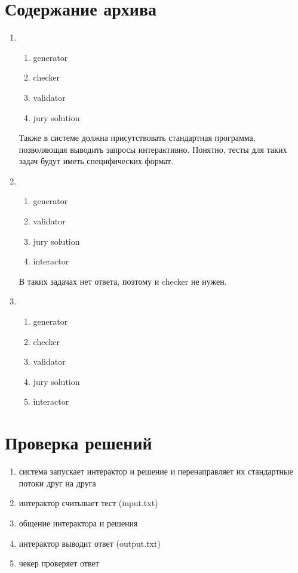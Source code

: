 \section{Содержание архива}
\begin{enumerate}
    \item
        \begin{enumerate}
            \item generator
            \item checker
            \item validator
            \item jury solution
        \end{enumerate}

    Также в системе должна присутствовать стандартная программа, позволяющая выводить запросы интерактивно. Понятно, тесты для таких задач будут иметь специфических формат.

    \item
        \begin{enumerate}
            \item generator
            \item validator
            \item jury solution
            \item interactor
        \end{enumerate}

   В таких задачах нет ответа, поэтому и checker не нужен.

    \item
        \begin{enumerate}
            \item generator
            \item checker
            \item validator
            \item jury solution
            \item interactor
        \end{enumerate}
\end{enumerate}

\section{Проверка решений}
\begin{enumerate}
    \item система запускает интерактор и решение и перенаправляет их стандартные потоки друг на друга
    \item интерактор считывает тест (input.txt)
    \item общение интерактора и решения
    \item интерактор выводит ответ (output.txt)
    \item чекер проверяет ответ
\end{enumerate}

